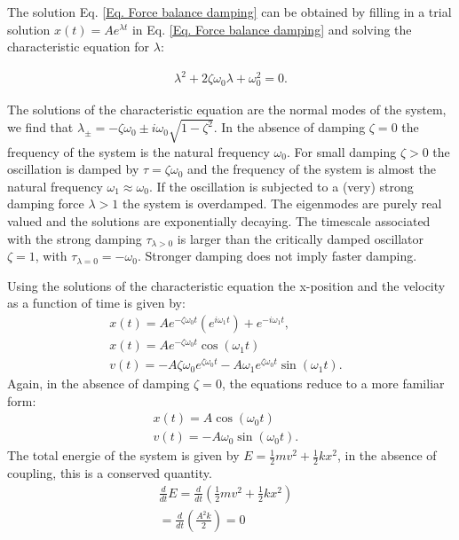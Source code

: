 \documentclass{article}
\begin{document}
The solution Eq. \ref{Eq. Force balance damping} can be obtained by filling in a trial solution $x(t) = Ae^{\lambda t}$ in Eq. \ref{Eq. Force balance damping} and solving the characteristic equation for $\lambda$:

\begin{align}
    \lambda^2 + 2\zeta\omega_0\lambda + \omega_0^2 = 0.
\end{align}

The solutions of the characteristic equation are the normal modes of the system, we find that $\lambda_{\pm} = -\zeta\omega_0 \pm i\omega_0\sqrt{1-\zeta^2}$. In the absence of damping $\zeta = 0$ the frequency of the system is the natural frequency $\omega_0$. For small damping $\zeta>0$ the oscillation is damped by $\tau = \zeta \omega_0$ and the frequency of the system is almost the natural frequency $\omega_1 \approx \omega_0$. If the oscillation is subjected to a (very) strong damping force $\lambda > 1$ the system is overdamped. The eigenmodes are purely real valued and the solutions are exponentially decaying. The timescale associated with the strong damping $\tau_{\lambda>0}$ is larger than the critically damped oscillator $\zeta =1$, with $\tau_{\lambda=0} = -\omega_0$. Stronger damping does not imply faster damping.

Using the solutions of the characteristic equation the x-position and the velocity as a function of time is given by:
\begin{align}
    x(t) = Ae^{-\zeta\omega_0t}(e^{i\omega_1t})+e^{-i\omega_1t}, & \\
    x(t) = Ae^{-\zeta\omega_0t}\cos(\omega_1 t) & \\
    v(t) = -A \zeta \omega_0 e^{\zeta \omega_0 t} - A \omega_1e^{\zeta \omega_0 t}\sin(\omega_1 t).
\end{align}
Again, in the absence of damping $\zeta = 0$, the equations reduce to a more familiar form:
\begin{align}
    x(t) = A\cos(\omega_0 t) & \\
    v(t) = - A \omega_0\sin(\omega_0 t).
\end{align}
The total energie of the system is given by $E=\frac{1}{2}mv^2+\frac{1}{2}kx^2$, in the absence of coupling, this is a conserved quantity.
\begin{align}
    \frac{d}{dt}E = \frac{d}{dt}(\frac{1}{2}mv^2 +\frac{1}{2}kx^2) & \\
    = \frac{d}{dt}(\frac{A^2 k}{2}) = 0
\end{align}
\end{document}
